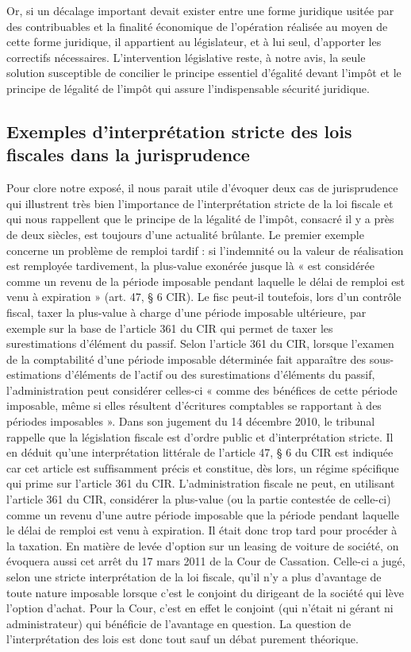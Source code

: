 \documentclass{book}
\begin{document}
Or, si un décalage important devait exister entre une forme juridique usitée par des contribuables et la ﬁnalité économique de l’opération réalisée au moyen de cette forme juridique, il appartient au législateur, et à lui seul, d’apporter les correctifs nécessaires. L’intervention législative reste, à notre avis, la seule solution susceptible de concilier le principe essentiel d’égalité devant l’impôt et le principe de légalité de l’impôt qui assure l’indispensable sécurité juridique.

\subsection*{Exemples d’interprétation stricte des lois ﬁscales dans la jurisprudence}

Pour clore notre exposé, il nous parait utile d’évoquer deux cas de jurisprudence qui illustrent très bien l’importance de l’interprétation stricte de la loi ﬁscale et qui nous rappellent que le principe de la légalité de l’impôt, consacré il y a près de deux siècles, est toujours d’une actualité brûlante. Le premier exemple concerne un problème de remploi tardif : si l’indemnité ou la valeur de réalisation est remployée tardivement, la plus-value exonérée jusque là « est considérée comme un revenu de la période imposable pendant laquelle le délai de remploi est venu à expiration » (art. 47, § 6 CIR). Le ﬁsc peut-il toutefois, lors d’un contrôle ﬁscal, taxer la plus-value à charge d’une période imposable ultérieure, par exemple sur la base de l’article 361 du CIR qui permet de taxer les surestimations d’élément du passif. Selon l’article 361 du CIR, lorsque l’examen de la comptabilité d’une période imposable déterminée fait apparaître des sous-estimations d’éléments de l’actif ou des surestimations d’éléments du passif, l’administration peut considérer celles-ci « comme des bénéfices de cette période imposable, même si elles résultent d’écritures comptables se rapportant à des périodes imposables ». Dans son jugement du 14 décembre 2010, le tribunal rappelle que la législation ﬁscale est d’ordre public et d’interprétation stricte. Il en déduit qu’une interprétation littérale de l’article 47, § 6 du CIR est indiquée car cet article est sufﬁsamment précis et constitue, dès lors, un régime spéciﬁque qui prime sur l’article 361 du CIR. L’administration ﬁscale ne peut, en utilisant l’article 361 du CIR, considérer la plus-value (ou la partie contestée de celle-ci) comme un revenu d’une autre période imposable que la période pendant laquelle le délai de remploi est venu à expiration. Il était donc trop tard pour procéder à la taxation. En matière de levée d’option sur un leasing de voiture de société, on évoquera aussi cet arrêt du 17 mars 2011 de la Cour de Cassation. Celle-ci a jugé, selon une stricte interprétation de la loi ﬁscale, qu’il n’y a plus d’avantage de toute nature imposable lorsque c’est le conjoint du dirigeant de la société qui lève l’option d’achat. Pour la Cour, c’est en effet le conjoint (qui n’était ni gérant ni administrateur) qui bénéﬁcie de l’avantage en question. La question de l’interprétation des lois est donc tout sauf un débat purement théorique.\\
\end{document}
